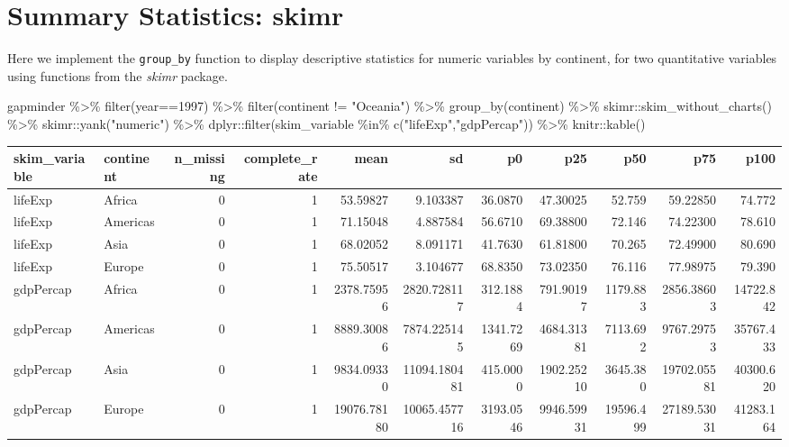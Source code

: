 \documentclass[
]{book}
\newenvironment{Shaded}{\begin{snugshade}}{\end{snugshade}}
\newcommand{\DecValTok}[1]{\textcolor[rgb]{0.00,0.00,0.81}{#1}}
\newcommand{\FunctionTok}[1]{\textcolor[rgb]{0.00,0.00,0.00}{#1}}
\newcommand{\NormalTok}[1]{#1}
\newcommand{\SpecialCharTok}[1]{\textcolor[rgb]{0.00,0.00,0.00}{#1}}
\newcommand{\StringTok}[1]{\textcolor[rgb]{0.31,0.60,0.02}{#1}}
\begin{document}
\hypertarget{summary-statistics-skimr}{%
\section{Summary Statistics: skimr}\label{summary-statistics-skimr}}

Here we implement the \texttt{group\_by} function to display descriptive statistics for numeric variables by continent, for two quantitative variables using functions from the \emph{skimr} package.

\begin{Shaded}
\begin{Highlighting}[]
\NormalTok{gapminder }\SpecialCharTok{\%\textgreater{}\%} \FunctionTok{filter}\NormalTok{(year}\SpecialCharTok{==}\DecValTok{1997}\NormalTok{) }\SpecialCharTok{\%\textgreater{}\%} 
  \FunctionTok{filter}\NormalTok{(continent }\SpecialCharTok{!=} \StringTok{"Oceania"}\NormalTok{) }\SpecialCharTok{\%\textgreater{}\%} 
  \FunctionTok{group\_by}\NormalTok{(continent) }\SpecialCharTok{\%\textgreater{}\%} 
\NormalTok{  skimr}\SpecialCharTok{::}\FunctionTok{skim\_without\_charts}\NormalTok{() }\SpecialCharTok{\%\textgreater{}\%}
\NormalTok{  skimr}\SpecialCharTok{::}\FunctionTok{yank}\NormalTok{(}\StringTok{"numeric"}\NormalTok{) }\SpecialCharTok{\%\textgreater{}\%}
\NormalTok{  dplyr}\SpecialCharTok{::}\FunctionTok{filter}\NormalTok{(skim\_variable }\SpecialCharTok{\%in\%} \FunctionTok{c}\NormalTok{(}\StringTok{"lifeExp"}\NormalTok{,}\StringTok{"gdpPercap"}\NormalTok{)) }\SpecialCharTok{\%\textgreater{}\%}
\NormalTok{  knitr}\SpecialCharTok{::}\FunctionTok{kable}\NormalTok{()}
\end{Highlighting}
\end{Shaded}

\begin{tabular}{l|l|r|r|r|r|r|r|r|r|r}
\hline
skim\_variable & continent & n\_missing & complete\_rate & mean & sd & p0 & p25 & p50 & p75 & p100\\
\hline
lifeExp & Africa & 0 & 1 & 53.59827 & 9.103387 & 36.0870 & 47.30025 & 52.759 & 59.22850 & 74.772\\
\hline
lifeExp & Americas & 0 & 1 & 71.15048 & 4.887584 & 56.6710 & 69.38800 & 72.146 & 74.22300 & 78.610\\
\hline
lifeExp & Asia & 0 & 1 & 68.02052 & 8.091171 & 41.7630 & 61.81800 & 70.265 & 72.49900 & 80.690\\
\hline
lifeExp & Europe & 0 & 1 & 75.50517 & 3.104677 & 68.8350 & 73.02350 & 76.116 & 77.98975 & 79.390\\
\hline
gdpPercap & Africa & 0 & 1 & 2378.75956 & 2820.728117 & 312.1884 & 791.90197 & 1179.883 & 2856.38603 & 14722.842\\
\hline
gdpPercap & Americas & 0 & 1 & 8889.30086 & 7874.225145 & 1341.7269 & 4684.31381 & 7113.692 & 9767.29753 & 35767.433\\
\hline
gdpPercap & Asia & 0 & 1 & 9834.09330 & 11094.180481 & 415.0000 & 1902.25210 & 3645.380 & 19702.05581 & 40300.620\\
\hline
gdpPercap & Europe & 0 & 1 & 19076.78180 & 10065.457716 & 3193.0546 & 9946.59931 & 19596.499 & 27189.53031 & 41283.164\\
\hline
\end{tabular}
\end{document}
